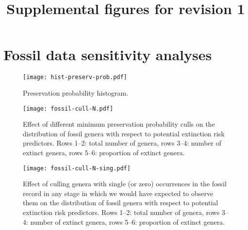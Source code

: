 \documentclass[11pt]{article}
\title{Supplemental figures for revision 1}
\author{}
\begin{document}
\maketitle

\section{Fossil data sensitivity analyses}

\begin{figure}[htbp]
\begin{center}
\texttt{[image: hist-preserv-prob.pdf]}
\caption{Preservation probability histogram.}
\label{fig:hist-preserv-prob}
\end{center}
\end{figure}

\clearpage

\begin{figure}[htbp]
\begin{center}
\texttt{[image: fossil-cull-N.pdf]}
\caption{Effect of different minimum preservation probability culls on the distribution of fossil genera with respect to potential extinction risk predictors. Rows 1--2: total number of genera, rows 3--4: number of extinct genera, rows 5--6: proportion of extinct genera.}
\end{center}
\end{figure}

\clearpage

\begin{figure}[htbp]
\begin{center}
\texttt{[image: fossil-cull-N-sing.pdf]}
\caption{Effect of culling genera with single (or zero) occurrences in the fossil record in any stage in which we would have expected to observe them on the distribution of fossil genera with respect to potential extinction risk predictors. Rows 1--2: total number of genera, rows 3--4: number of extinct genera, rows 5--6: proportion of extinct genera.}
\end{center}
\end{figure}

\clearpage

\end{document}
